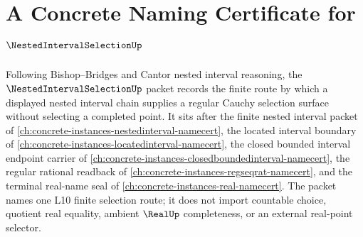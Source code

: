 \chapter{A Concrete Naming Certificate for $\NestedIntervalSelectionUp$}
\label{ch:concrete-instances-nested-interval-selection-namecert}

Following Bishop--Bridges and Cantor nested interval reasoning, the $\NestedIntervalSelectionUp$ packet records the finite route by which a displayed nested interval chain supplies a regular Cauchy selection surface without selecting a completed point. It sits after the finite nested interval packet of \autoref{ch:concrete-instances-nestedinterval-namecert}, the located interval boundary of \autoref{ch:concrete-instances-locatedinterval-namecert}, the closed bounded interval endpoint carrier of \autoref{ch:concrete-instances-closedboundedinterval-namecert}, the regular rational readback of \autoref{ch:concrete-instances-regseqrat-namecert}, and the terminal real-name seal of \autoref{ch:concrete-instances-real-namecert}. The packet names one L10 finite selection route; it does not import countable choice, quotient real equality, ambient $\RealUp$ completeness, or an external real-point selector.

